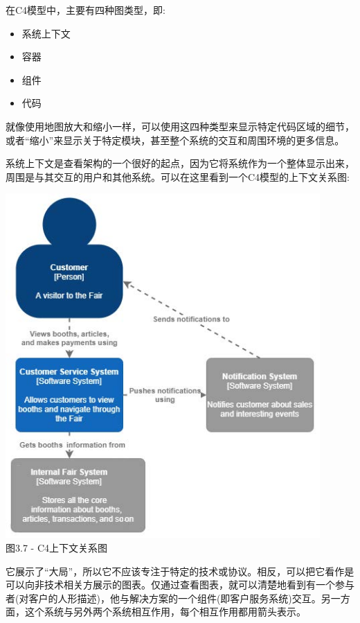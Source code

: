 在C4模型中，主要有四种图类型，即:

\begin{itemize}
\item
系统上下文

\item 
容器

\item
组件

\item
代码
\end{itemize}

就像使用地图放大和缩小一样，可以使用这四种类型来显示特定代码区域的细节，或者“缩小”来显示关于特定模块，甚至整个系统的交互和周围环境的更多信息。

系统上下文是查看架构的一个很好的起点，因为它将系统作为一个整体显示出来，周围是与其交互的用户和其他系统。可以在这里看到一个C4模型的上下文关系图:

\begin{center}
\includegraphics[width=0.9\textwidth]{content/1/chapter3/images/7.jpg}\\
图3.7 - C4上下文关系图
\end{center}

它展示了“大局”，所以它不应该专注于特定的技术或协议。相反，可以把它看作是可以向非技术相关方展示的图表。仅通过查看图表，就可以清楚地看到有一个参与者(对客户的人形描述)，他与解决方案的一个组件(即客户服务系统)交互。另一方面，这个系统与另外两个系统相互作用，每个相互作用都用箭头表示。

